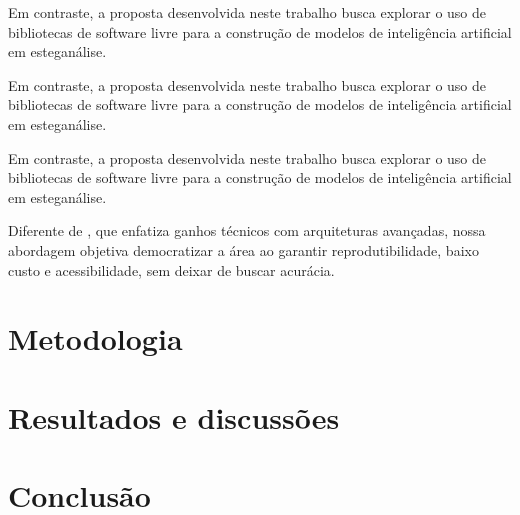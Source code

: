\documentclass[12pt]{article}
\begin{document}
 Em contraste, a proposta desenvolvida neste trabalho busca explorar o uso de bibliotecas de software livre para a construção de modelos de inteligência artificial em esteganálise.

Em contraste, a proposta desenvolvida neste trabalho busca explorar o uso de bibliotecas de software livre para a construção de modelos de inteligência artificial em esteganálise.

Em contraste, a proposta desenvolvida neste trabalho busca explorar o uso de bibliotecas de software livre para a construção de modelos de inteligência artificial em esteganálise.

Diferente de \cite{chubachi2020cnn}, que enfatiza ganhos técnicos com arquiteturas avançadas, nossa abordagem objetiva democratizar a área ao garantir reprodutibilidade, baixo custo e acessibilidade, sem deixar de buscar acurácia.



\section{Metodologia}

\section{Resultados e discussões}

\section{Conclusão}\label{sec:figs}






\end{document}

